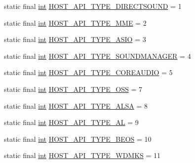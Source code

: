 \begin{DoxyCompactItemize}
\item 
static final \hyperlink{xmltok_8h_a5a0d4a5641ce434f1d23533f2b2e6653}{int} \hyperlink{classcom_1_1portaudio_1_1_port_audio_a6a986e1b33fc0f6dfb6c7d562a4d51d9}{H\+O\+S\+T\+\_\+\+A\+P\+I\+\_\+\+T\+Y\+P\+E\+\_\+\+D\+I\+R\+E\+C\+T\+S\+O\+U\+ND} = 1
\item 
static final \hyperlink{xmltok_8h_a5a0d4a5641ce434f1d23533f2b2e6653}{int} \hyperlink{classcom_1_1portaudio_1_1_port_audio_aa5aa443407edd49f2aefe05c05a05cd3}{H\+O\+S\+T\+\_\+\+A\+P\+I\+\_\+\+T\+Y\+P\+E\+\_\+\+M\+ME} = 2
\item 
static final \hyperlink{xmltok_8h_a5a0d4a5641ce434f1d23533f2b2e6653}{int} \hyperlink{classcom_1_1portaudio_1_1_port_audio_ada483f7837f8bba9cc062f7fd068bf6f}{H\+O\+S\+T\+\_\+\+A\+P\+I\+\_\+\+T\+Y\+P\+E\+\_\+\+A\+S\+IO} = 3
\item 
static final \hyperlink{xmltok_8h_a5a0d4a5641ce434f1d23533f2b2e6653}{int} \hyperlink{classcom_1_1portaudio_1_1_port_audio_a3e994d6f1b8393c1fadf330fc18b5649}{H\+O\+S\+T\+\_\+\+A\+P\+I\+\_\+\+T\+Y\+P\+E\+\_\+\+S\+O\+U\+N\+D\+M\+A\+N\+A\+G\+ER} = 4
\item 
static final \hyperlink{xmltok_8h_a5a0d4a5641ce434f1d23533f2b2e6653}{int} \hyperlink{classcom_1_1portaudio_1_1_port_audio_ab0408bbb1b5312837354f6622ed56da5}{H\+O\+S\+T\+\_\+\+A\+P\+I\+\_\+\+T\+Y\+P\+E\+\_\+\+C\+O\+R\+E\+A\+U\+D\+IO} = 5
\item 
static final \hyperlink{xmltok_8h_a5a0d4a5641ce434f1d23533f2b2e6653}{int} \hyperlink{classcom_1_1portaudio_1_1_port_audio_a0cb0af6edee17cf295e8049704022d00}{H\+O\+S\+T\+\_\+\+A\+P\+I\+\_\+\+T\+Y\+P\+E\+\_\+\+O\+SS} = 7
\item 
static final \hyperlink{xmltok_8h_a5a0d4a5641ce434f1d23533f2b2e6653}{int} \hyperlink{classcom_1_1portaudio_1_1_port_audio_a2cf938238890b34503d58db47a454e72}{H\+O\+S\+T\+\_\+\+A\+P\+I\+\_\+\+T\+Y\+P\+E\+\_\+\+A\+L\+SA} = 8
\item 
static final \hyperlink{xmltok_8h_a5a0d4a5641ce434f1d23533f2b2e6653}{int} \hyperlink{classcom_1_1portaudio_1_1_port_audio_a034414578c6cb7d1ef05dbb97d4030ef}{H\+O\+S\+T\+\_\+\+A\+P\+I\+\_\+\+T\+Y\+P\+E\+\_\+\+AL} = 9
\item 
static final \hyperlink{xmltok_8h_a5a0d4a5641ce434f1d23533f2b2e6653}{int} \hyperlink{classcom_1_1portaudio_1_1_port_audio_a9947391c7afe60e9bfef0b8362ab9467}{H\+O\+S\+T\+\_\+\+A\+P\+I\+\_\+\+T\+Y\+P\+E\+\_\+\+B\+E\+OS} = 10
\item 
static final \hyperlink{xmltok_8h_a5a0d4a5641ce434f1d23533f2b2e6653}{int} \hyperlink{classcom_1_1portaudio_1_1_port_audio_a61826bf26d326ff98510f1274f6f3f5b}{H\+O\+S\+T\+\_\+\+A\+P\+I\+\_\+\+T\+Y\+P\+E\+\_\+\+W\+D\+M\+KS} = 11

\end{DoxyCompactItemize}
